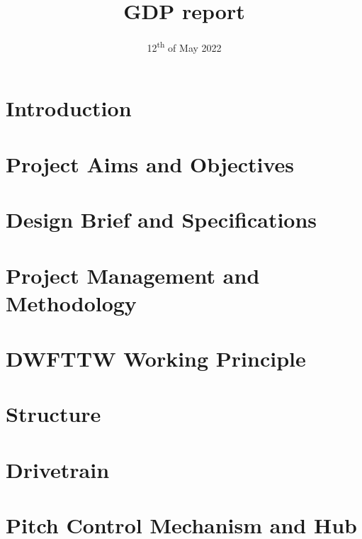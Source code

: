 \documentclass{article}
\title{GDP report} %
\date{12\textsuperscript{th} of May 2022} %
\begin{document}



\begin{multicols}{2}
\end{multicols}
\newpage



\section{Introduction}


\section{Project Aims and Objectives}


\section{Design Brief and Specifications}


\section{Project Management and Methodology}


\section{DWFTTW Working Principle}


\section{Structure}


\section{Drivetrain}


\section{Pitch Control Mechanism and Hub}

\end{document}
